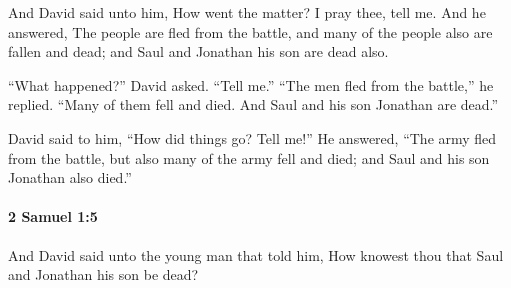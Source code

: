 			\begin{versebox}
					\item[BHS] 
					\item[ASV] And David said unto him, How went the matter? I pray thee, tell me. And he answered, The people are fled from the battle, and many of the people also are fallen and dead; and Saul and Jonathan his son are dead also.
					\item[NIV] “What happened?” David asked. “Tell me.” “The men fled from the battle,” he replied. “Many of them fell and died. And Saul and his son Jonathan are dead.”
					\item[NRSV] David said to him, “How did things go? Tell me!” He answered, “The army fled from the battle, but also many of the army fell and died; and Saul and his son Jonathan also died.”
			\end{versebox}

		\paragraph{2 Samuel 1:5} %
			\label{2SAMUEL-1-5}

			And David said unto the young man that told him, How knowest thou that Saul and Jonathan his son be dead?

